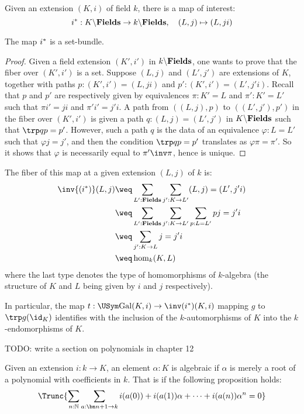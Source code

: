 Given an extension $(K,i)$ of field $k$, there is a map of interest:
\begin{displaymath}
  {{i}^\ast}: K\backslash\mathbf{Fields} \to k\backslash\mathbf{Fields},\quad (L,j) \mapsto (L,ji)
\end{displaymath}

\begin{lemma}
  The map ${{i}^\ast}$ is a set-bundle.
  \label{lem:field-ext-restriction-set-bundle}
\end{lemma}
\begin{proof}
  Given a field extension $(K',i')$ in $k\backslash\mathbf{Fields}$, one wants to prove that
  the fiber over $(K',i')$ is a set. Suppose $(L,j)$ and $(L',j')$ are
  extensions of $K$, together with paths $p:(K',i') = (L,ji)$ and $p': (K',i')
  = (L',j'i)$. Recall that $p$ and $p'$ are respectively given by equivalences
  $\pi: K' = L$ and $\pi': K' = L'$ such that $\pi i' = ji$ and $\pi' i' =
  j'i$. 
  A path from $( (L,j), p)$ to $( (L',j'), p')$ in the fiber over $(K',i')$ is
  given a path $q: (L,j) = (L',j')$ in $K\backslash\mathbf{Fields}$ such that $\trp q p =
  p'$. However, such a path $q$ is the data of an equivalence $\varphi : L =
  L'$ such that $\varphi j = j'$, and then the condition $\trp q p = p'$
  translates as $\varphi \pi = \pi'$. So it shows that $\varphi$ is necessarily
  equal to $\pi'\inv\pi$, hence is unique.  
\end{proof}

The fiber of this map at a given extension $(L,j)$ of $k$ is:
\begin{align*}
  \inv{(\restr i)}(L,j) &\weq \sum_{L':\fieldstype}\sum_{j':K \to L'}(L,j) = (L',j'i) \\
  &\weq \sum_{L':\fieldstype}\sum_{j':K\to L'}\sum_{p:L = L'} pj=j'i \\
  &\weq \sum_{j':K\to L} j=j'i \\
  &\weq \hom_k(K,L)
\end{align*}
where the last type denotes the type of homomorphisms of $k$-algebra (the structure of $K$ and $L$ being given by $i$ and $j$ respectively).

In particular, the map $t: \USym \Gal(K,i) \to \inv(\restr i)(K,i)$ mapping $g$ to
$\trp g (\id_K)$ identifies with the inclusion of the $k$-automorphisms of $K$
into the $k$-endomorphisms of $K$.

{\color{red} TODO: write a section on polynomials in chapter 12}
%
\begin{definition}
  Given an extension $i:k\to K$, an element $\alpha:K$ is algebraic if $\alpha$ is merely
  a root of a polynomial with coefficients in $k$. That is if the following
  proposition holds:
  \begin{displaymath}
    \Trunc{\sum_{n:\mathbb N}\sum_{a:\bn n + 1 \to k}i(a(0))+i(a(1))\alpha+\cdots+i(a(n))\alpha^n=0}%
  \end{displaymath}
  \label{defn:algebraic-element}
\end{definition}

